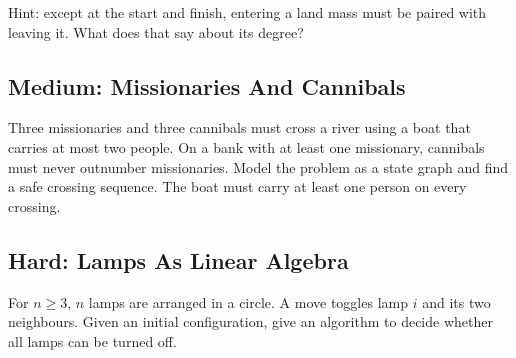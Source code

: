 \documentclass[12pt]{article}
\begin{document}
\begin{center}
\end{center}
Hint: except at the start and finish, entering a land mass must be
paired with leaving it. What does that say about its degree?

\subsection*{Medium: Missionaries And Cannibals}
Three missionaries and three cannibals must cross a river using a
boat that carries at most two people. On a bank with at least one
missionary, cannibals must never outnumber missionaries. Model the
problem as a state graph and find a safe crossing sequence. The boat
must carry at least one person on every crossing.

\begin{center}
\end{center}

\subsection*{Hard: Lamps As Linear Algebra}
For $n\ge3$, $n$ lamps are arranged in a circle. A move toggles lamp
$i$ and its two neighbours. Given an initial configuration, give an
algorithm to decide whether all lamps can be turned off.
\end{document}
